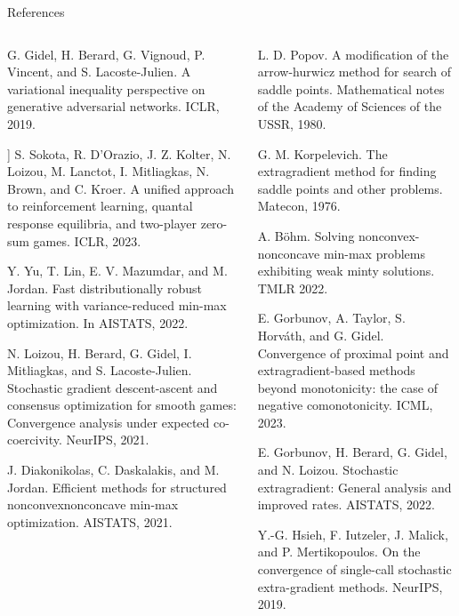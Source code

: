 \documentclass[24pt,final]{beamer}
\newlength{\onecolwid}
\newlength{\twocolwid}
\begin{document}
\begin{frame}[t]
\begin{columns}[t]
\begin{column}{\twocolwid}
\vspace{-1cm}
\begin{block}{References}
			\end{block}
\vspace{-3cm}
\begin{columns}[t,totalwidth=\twocolwid]

\begin{column}{\onecolwid}
\tiny{\begin{enumerate}[label={[\arabic*]}]
   \item G. Gidel, H. Berard, G. Vignoud, P. Vincent, and S. Lacoste-Julien. A variational inequality perspective on generative adversarial networks. ICLR, 2019.
   \item ] S. Sokota, R. D’Orazio, J. Z. Kolter, N. Loizou, M. Lanctot, I. Mitliagkas, N. Brown, and C. Kroer. A unified approach to reinforcement learning, quantal response equilibria, and two-player zero-sum games. ICLR, 2023.
   \item Y. Yu, T. Lin, E. V. Mazumdar, and M. Jordan. Fast distributionally robust learning with variance-reduced min-max optimization. In AISTATS, 2022.
   \item N. Loizou, H. Berard, G. Gidel, I. Mitliagkas, and S. Lacoste-Julien. Stochastic gradient descent-ascent and consensus optimization for smooth games: Convergence analysis under expected co-coercivity. NeurIPS, 2021.
   \item J. Diakonikolas, C. Daskalakis, and M. Jordan. Efficient methods for structured nonconvexnonconcave min-max optimization. AISTATS, 2021.
\end{enumerate}}
    
\end{column}

\begin{column}{\onecolwid}
\tiny{\begin{enumerate}[label={[\arabic*]}]
\setcounter{enumi}{5}
\item L. D. Popov. A modification of the arrow-hurwicz method for search of saddle points. Mathematical notes of the Academy of Sciences of the USSR, 1980.
\item G. M. Korpelevich. The extragradient method for finding saddle points and other problems. Matecon, 1976.
\item A. Böhm. Solving nonconvex-nonconcave min-max problems exhibiting weak minty solutions. TMLR 2022.
\item E. Gorbunov, A. Taylor, S. Horváth, and G. Gidel. Convergence of proximal point and extragradient-based methods beyond monotonicity: the case of negative comonotonicity. ICML, 2023.
\item E. Gorbunov, H. Berard, G. Gidel, and N. Loizou. Stochastic extragradient: General analysis and improved rates. AISTATS, 2022.
\item Y.-G. Hsieh, F. Iutzeler, J. Malick, and P. Mertikopoulos. On the convergence of single-call stochastic extra-gradient methods. NeurIPS, 2019.



\end{enumerate}}
\end{column}
\end{columns}
\end{column}
\end{columns}
\end{frame}
\end{document}
